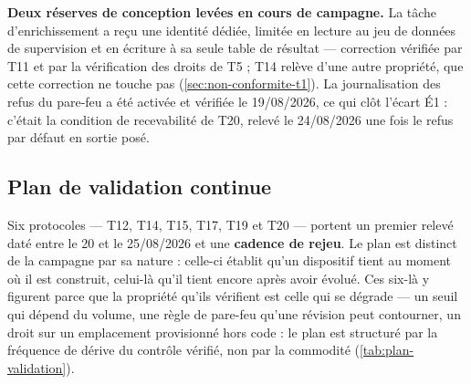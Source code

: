 \textbf{Deux réserves de conception levées en cours de campagne.} La tâche d'enrichissement a
reçu une identité dédiée, limitée en lecture au jeu de données de supervision et en écriture à sa
seule table de résultat --- correction vérifiée par T11 et par la vérification des droits de T5 ;
T14 relève d'une autre propriété, que cette correction ne touche pas
(\cref{sec:non-conformite-t1}). La journalisation des refus du pare-feu a été activée et vérifiée
le 19/08/2026, ce qui clôt l'écart É1 : c'était la condition de recevabilité de T20, relevé le
24/08/2026 une fois le refus par défaut en sortie posé.

\subsection{Plan de validation continue}
\label{sec:plan-validation}

Six protocoles --- T12, T14, T15, T17, T19 et T20 --- portent un premier relevé daté entre le 20 et
le 25/08/2026 et une \textbf{cadence de rejeu}. Le plan est distinct de la campagne par sa nature :
celle-ci établit qu'un dispositif tient au moment où il est construit, celui-là qu'il tient encore
après avoir évolué. Ces six-là y figurent parce que la propriété qu'ils vérifient est celle qui se
dégrade --- un seuil qui dépend du volume, une règle de pare-feu qu'une révision peut contourner, un
droit sur un emplacement provisionné hors code : le plan est structuré par la fréquence de dérive du
contrôle vérifié, non par la commodité (\cref{tab:plan-validation}).

